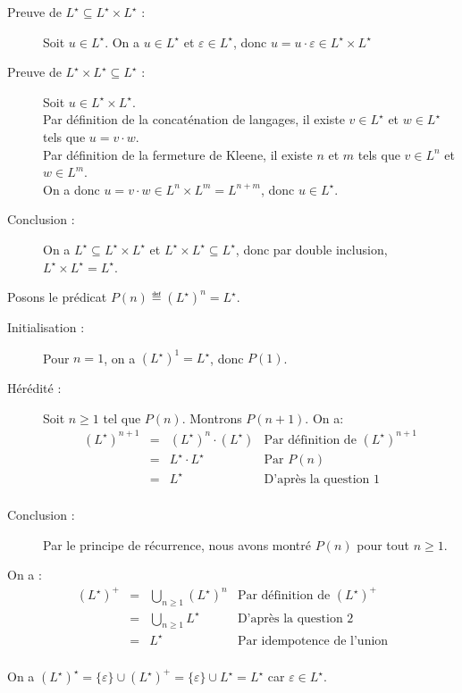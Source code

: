 \begin{corrections}
\begin{questions}
  \item 
    \begin{description}
    \item[Preuve de $L^\star \subseteq L^\star \times L^\star$ :] Soit $u \in L^\star$. On a $u \in L^\star$ et $\varepsilon \in L^\star$, donc
      $u = u \cdot \varepsilon \in L^\star \times L^\star$
    \item[Preuve de $L^\star \times L^\star \subseteq L^\star$ :] Soit $u \in L^\star \times L^\star$.\\
      Par définition de la concaténation de langages, il existe $v \in L^\star$ et $w \in L^\star$ tels que $u=v\cdot w$.\\
      Par définition de la fermeture de Kleene, il existe $n$ et $m$ tels que $v \in L^n$ et $w \in L^m$.\\
      On a donc $u=v\cdot w \in L^n \times L^m = L^{n+m}$, donc $u\in L^\star$.
    \item[Conclusion :] On a $L^\star \subseteq L^\star \times L^\star$ et $L^\star \times L^\star \subseteq L^\star$,
      donc par double inclusion, $L^\star \times L^\star = L^\star$. 
    \end{description}
  \item Posons le prédicat $P(n) \eqdef (L^\star)^n = L^\star$.
    \begin{description}
    \item[Initialisation :] Pour $n = 1$, on a $(L^\star)^1 = L^\star$, donc $P(1)$.  
    \item[Hérédité :] Soit $n \ge 1$ tel que $P(n)$. Montrons $P(n+1)$. On a:
      $$\begin{array}{rcll}
      (L^\star)^{n+1} &=& (L^\star)^{n} \cdot (L^\star) & \text{Par définition de $(L^\star)^{n+1}$}\\
      &=& L^\star \cdot L^\star & \text{Par $P(n)$}\\
      &=& L^\star & \text{D'après la question 1}\\
      \end{array}$$
    \item[Conclusion :] Par le principe de récurrence, nous avons montré $P(n)$ pour tout $n\ge 1$.
    \end{description}
  \item On a :
      $$\begin{array}{rcll}
      (L^\star)^+ &=& \bigcup_{n\ge 1} (L^\star)^{n} & \text{Par définition de $(L^\star)^+$}\\
      &=& \bigcup_{n\ge 1} L^\star & \text{D'après la question 2}\\
      &=& L^\star & \text{Par idempotence de l'union}\\
      \end{array}$$
  \item On a $(L^\star)^\star = \{\varepsilon\} \cup (L^\star)^+ = \{\varepsilon\} \cup L^\star = L^\star$ car $\varepsilon\in L^\star$.
  \end{questions}

\end{corrections}

\endgroup
\endinput
